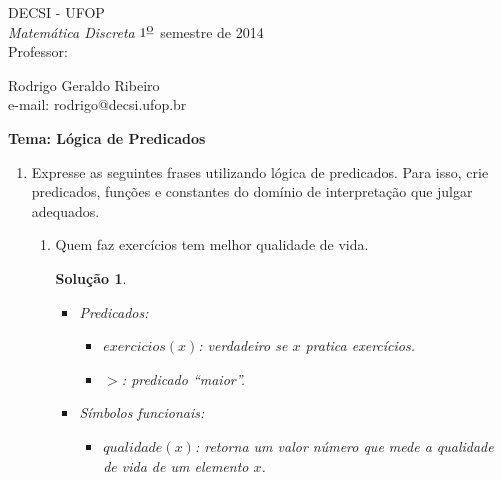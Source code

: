 \documentclass[11pt,a4paper]{report}
\begin{document}
 
 \hfill DECSI - UFOP \\
{\it Matem\'atica Discreta}
 \hfill $\mbox{1}^{\mbox{\underline{o}}}$ semestre de 2014 \\
Professor: \parbox[t]{14cm}{Rodrigo Geraldo Ribeiro \\
                     e-mail: rodrigo@decsi.ufop.br}
 
\newtheorem*{Solucao}{Solu\c{c}\~ao}
\newcommand{\F}{$F$}
\newcommand{\T}{$T$}

 \hfill {\bf Tema: L\'ogica de Predicados}
 
\vspace*{3mm}
\begin{enumerate}
  	\item Expresse as seguintes frases utilizando l\'ogica de predicados. 
	      Para isso, crie predicados, fun\c{c}\~oes e constantes do dom\'inio
	      de interpreta\c{c}\~ao que julgar adequados.
	\begin{enumerate}
		\item Quem faz exerc\'icios tem melhor qualidade de
                  vida.
                  \begin{Solucao}
                    \verb| |\\
                    \begin{itemize}
                      \item Predicados: 
                        \begin{itemize}
                          \item $exercicios(x)$: verdadeiro se $x$
                            pratica exerc\'icios.
                          \item $>$: predicado ``maior''. 
                        \end{itemize}
                        \item S\'imbolos funcionais:
                          \begin{itemize}
                            \item $qualidade(x)$: retorna um valor
                              n\'umero que mede a qualidade de vida de
                              um elemento $x$.
                          \end{itemize}
                    \end{itemize}


\end{Solucao}
\end{enumerate}
\end{enumerate}
\end{document}
